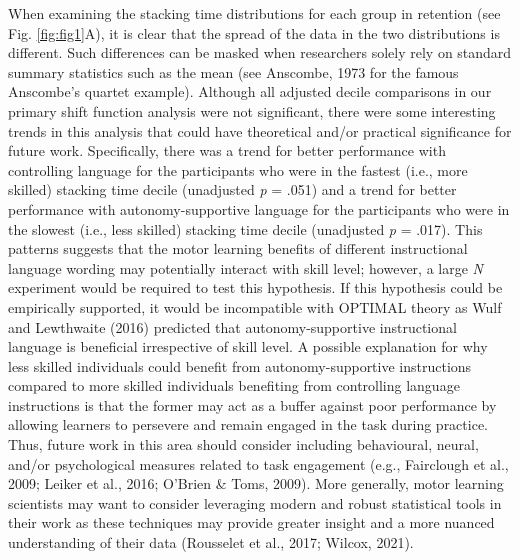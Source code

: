 \documentclass[
  man, donotrepeattitle,mask,floatsintext]{apa7}
\begin{document}
When examining the stacking time distributions for each group in retention (see Fig. \ref{fig:fig1}A), it is clear that the spread of the data in the two distributions is different. Such differences can be masked when researchers solely rely on standard summary statistics such as the mean (see Anscombe, 1973 for the famous Anscombe's quartet example). Although all adjusted decile comparisons in our primary shift function analysis were not significant, there were some interesting trends in this analysis that could have theoretical and/or practical significance for future work. Specifically, there was a trend for better performance with controlling language for the participants who were in the fastest (i.e., more skilled) stacking time decile (unadjusted \emph{p} = .051) and a trend for better performance with autonomy-supportive language for the participants who were in the slowest (i.e., less skilled) stacking time decile (unadjusted \emph{p} = .017). This patterns suggests that the motor learning benefits of different instructional language wording may potentially interact with skill level; however, a large \emph{N} experiment would be required to test this hypothesis. If this hypothesis could be empirically supported, it would be incompatible with OPTIMAL theory as Wulf and Lewthwaite (2016) predicted that autonomy-supportive instructional language is beneficial irrespective of skill level. A possible explanation for why less skilled individuals could benefit from autonomy-supportive instructions compared to more skilled individuals benefiting from controlling language instructions is that the former may act as a buffer against poor performance by allowing learners to persevere and remain engaged in the task during practice. Thus, future work in this area should consider including behavioural, neural, and/or psychological measures related to task engagement (e.g., Fairclough et al., 2009; Leiker et al., 2016; O'Brien \& Toms, 2009). More generally, motor learning scientists may want to consider leveraging modern and robust statistical tools in their work as these techniques may provide greater insight and a more nuanced understanding of their data (Rousselet et al., 2017; Wilcox, 2021).
\end{document}
